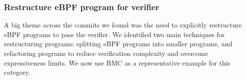 %






\subsubsection{Restructure eBPF program for verifier}
\label{motivation:restructure}
A big theme across the commits we found was the need to explicitly restructure eBPF programs to pass the verifier.
We identified two main techniques for restructuring programs: splitting eBPF programs into smaller programs, and refactoring programs to reduce verification complexity and overcome expressiveness limits.
We now use BMC\cite{BMC} as a representative example for this category.

